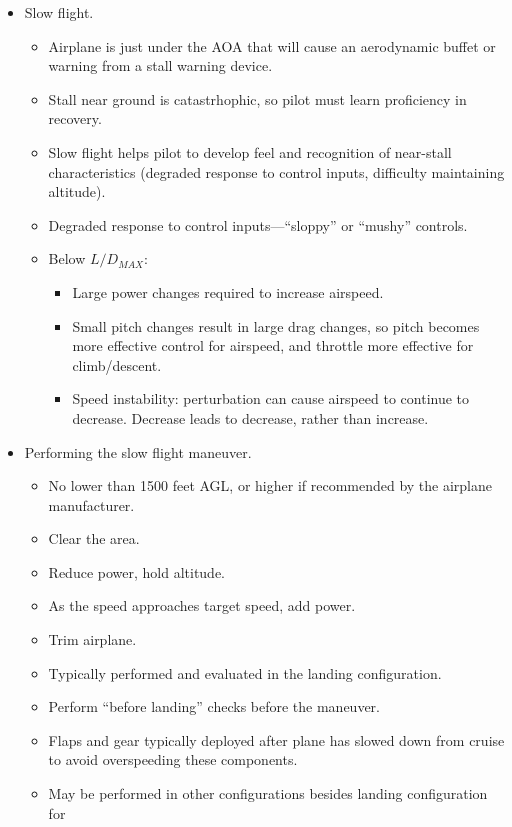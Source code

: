 \documentclass[letterpaper,10pt,titlepage]{article}
\begin{document}
\begin{itemize}
\begin{itemize}
	  \end{itemize}
\item Slow flight.
	  \begin{itemize}
	  \item Airplane is just under the AOA that will cause an aerodynamic buffet or warning
	        from a stall warning device.
	  \item Stall near ground is catastrhophic, so pilot must learn proficiency in recovery.
	  \item Slow flight helps pilot to develop feel and recognition of near-stall characteristics (degraded
	        response to control inputs, difficulty maintaining altitude).
	  \item Degraded response to control inputs---``sloppy'' or ``mushy'' controls.
	  \item Below $L/D_{MAX}$:
    	  \begin{itemize}
	      \item Large power changes required to increase airspeed.
	      \item Small pitch changes result in large drag changes, so pitch becomes more effective control for airspeed,
		        and throttle more effective for climb/descent.
	      \item Speed instability:  perturbation can cause airspeed to continue to decrease.  Decrease leads to decrease,
		        rather than increase.
	      \end{itemize}
	  \end{itemize}
\item Performing the slow flight maneuver.
	  \begin{itemize}
	  \item No lower than 1500 feet AGL, or higher if recommended by the airplane manufacturer.
	  \item Clear the area.
	  \item Reduce power, hold altitude.
	  \item As the speed approaches target speed, add power.
	  \item Trim airplane.
	  \item Typically performed and evaluated in the landing configuration.
	  \item Perform ``before landing'' checks before the maneuver.
	  \item Flaps and gear typically deployed after plane has slowed down from cruise
	        to avoid overspeeding these components.
	  \item May be performed in other configurations besides landing configuration for

\end{itemize}
\end{itemize}
\end{document}
